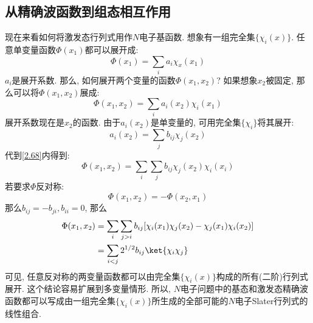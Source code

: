 \subsection{从精确波函数到组态相互作用}
 \label{sec2.2.7}
现在来看如何将激发态行列式用作$N$电子基函数. 
想象有一组完全集$\{\chi_i(x)\}$. 
任意单变量函数$\Phi(x_1)$都可以展开成:
\begin{equation}
	\Phi(x_1)=\sum_ia_i\chi_x(x_1)
\end{equation}
$a_i$是展开系数. 那么, 如何展开两个变量的函数$\Phi(x_1,x_2)$? 如果想象$x_2$被固定, 那么可以将$\Phi(x_1,x_2)$展成:
\begin{equation}
\label{2.68}
\Phi(x_1,x_2)=\sum_ia_i(x_2)\chi_i(x_1)
\end{equation}
展开系数现在是$x_2$的函数. 
由于$a_i(x_2)$是单变量的, 
可用完全集$\{\chi_i \}$将其展开:
\begin{equation}
a_i(x_2)=\sum_jb_{ij}\chi_j(x_2)
\end{equation}
代到\autoref{2.68}内得到:
\begin{equation}
\Phi(x_1,x_2)=\sum_i\sum_jb_{ij}\chi_j(x_2)\chi_i(x_i)
\end{equation}
若要求$\Phi$反对称:
\begin{equation}
\Phi(x_1,x_2)=-\Phi(x_2,x_1)
\end{equation}
那么$b_{ij}=-b_{ji},b_{ii}=0$, 
那么
\begin{equation}
\begin{split}
\Phi(x_1,x_2)&=\sum_i\sum_{j>i}b_{ij}[\chi_i(x_1)\chi_j(x_2)-\chi_j(x_1)\chi_i(x_2)]\\
&=\sum_{i<j}2^{1/2}b_{ij}\ket{\chi_i\chi_j}
\end{split}
\end{equation}
可见, 
任意反对称的两变量函数都可以由完全集$\{\chi_i(x)\}$构成的所有(二阶)行列式展开. 
这个结论容易扩展到多变量情形. 
所以, 
$N$电子问题中的基态和激发态精确波函数都可以写成由一组完全集$\{\chi_i(x) \}$所生成的全部可能的$N$电子Slater行列式的线性组合.


